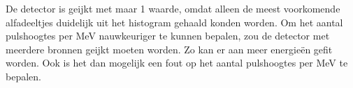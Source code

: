 \documentclass[11pt,a4paper]{article}
\begin{document}
De detector is geijkt met maar 1 waarde, omdat alleen de meest voorkomende alfadeeltjes duidelijk uit het histogram gehaald konden worden. Om het aantal pulshoogtes per MeV nauwkeuriger te kunnen bepalen, zou de detector met meerdere bronnen geijkt moeten worden. Zo kan er aan meer energieën gefit worden. Ook is het dan mogelijk een fout op het aantal pulshoogtes per MeV te bepalen.




\end{document}
